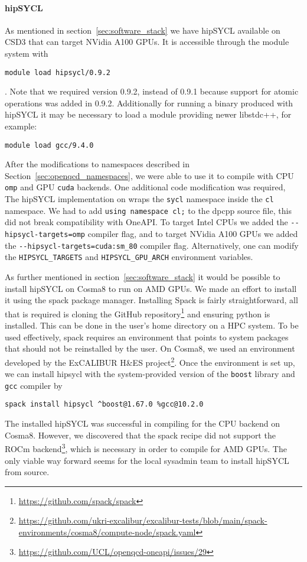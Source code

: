 \documentclass[../main]{subfiles}
\begin{document}
\paragraph{hipSYCL}

As mentioned in section~\ref{sec:software_stack} we have hipSYCL available on CSD3 that can target NVidia A100 GPUs.
It is accessible through the module system with
\begin{verbatim}
module load hipsycl/0.9.2
\end{verbatim}.
Note that we required version 0.9.2, instead of 0.9.1 because support for atomic operations was added in 0.9.2.
Additionally for running a binary produced with hipSYCL it may be necessary to load a module providing newer libstdc++, for example:
\begin{verbatim}
module load gcc/9.4.0
\end{verbatim}
After the modifications to namespaces described in Section~\ref{sec:openqcd_namespaces}, we were able to use it to compile with CPU \texttt{omp} and GPU \texttt{cuda} backends.
One additional code modification was required, The hipSYCL implementation on wraps the \texttt{sycl} namespace inside the \texttt{cl} namespace.
We had to add \verb !using namespace cl;! to the dpcpp source file, this did not break compatibility with OneAPI.
To target Intel CPUs we added the \verb !--hipsycl-targets=omp! compiler flag, and to target NVidia A100 GPUs we added the \verb !--hipsycl-targets=cuda:sm_80! compiler flag.
Alternatively, one can modify the \verb !HIPSYCL_TARGETS! and \verb !HIPSYCL_GPU_ARCH! environment variables.

As further mentioned in section~\ref{sec:software_stack} it would be possible to install hipSYCL on Cosma8 to run on AMD GPUs. We made an effort to install it using the spack package manager.
Installing Spack is fairly straightforward, all that is required is cloning the GitHub repository\footnote{\url{https://github.com/spack/spack}} and ensuring python is installed.
This can be done in the user's home directory on a HPC system.
To be used effectively, spack requires an environment that points to system packages that should not be reinstalled by the user.
On Cosma8, we used an environment developed by the ExCALIBUR H\&ES project\footnote{\url{https://github.com/ukri-excalibur/excalibur-tests/blob/main/spack-environments/cosma8/compute-node/spack.yaml}}.
Once the environment is set up, we can install hipsycl with the system-provided version of the \texttt{boost} library and \texttt{gcc} compiler by
\begin{verbatim}
spack install hipsycl ^boost@1.67.0 %gcc@10.2.0
\end{verbatim}
The installed hipSYCL was successful in compiling for the CPU backend on Cosma8.
However, we discovered that the spack recipe did not support the ROCm backend\footnote{\url{https://github.com/UCL/openqcd-oneapi/issues/29}}, which is necessary in order to compile for AMD GPUs. The only viable way forward seems for the local sysadmin team to install hipSYCL from source.
\end{document}
